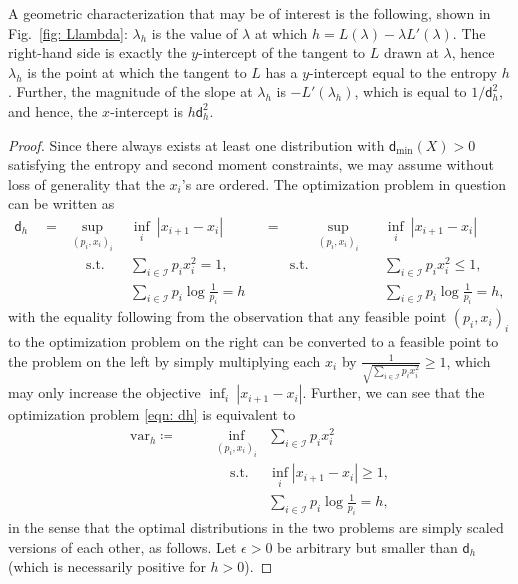 \documentclass[11pt]{article}
\newcommand{\calI}{\mathcal{I}}
\newcommand{\var}{\mathrm{var}}
\newcommand{\dmin}{\mathsf{d}_{\min}}
\newcommand{\dist}{\mathsf{d}}
\begin{document}
	A geometric characterization that may be of interest is the following, shown in Fig.~\ref{fig: Llambda}: $\lambda_h$ is the value of $\lambda$ at which $h = L(\lambda) - \lambda L'(\lambda)$.  The right-hand side is exactly the $y$-intercept of the tangent to $L$ drawn at $\lambda$, hence $\lambda_h$ is the point at which the tangent to $L$ has a $y$-intercept equal to the entropy $h$.  Further, the magnitude of the slope at $\lambda_h$ is $-L'(\lambda_h)$, which is equal to $1/\dist_h^2$, and hence, the $x$-intercept is $h \dist_h^2$.  
	
	
	\begin{proof} Since there always exists at least one distribution with $\dmin(X) > 0$ satisfying the entropy and second moment constraints, we may assume without loss of generality that the $x_i$'s are ordered.
		The optimization problem in question can be written as
		\begin{equation}
			\begin{aligned}
				\dist_h \quad =  &\sup_{(p_i, x_i)_i} &\inf_{i}\ |x_{i+1} - x_i| \qquad& =&\qquad  \sup_{(p_i, x_i)_i} \quad &\inf_{i}\ |x_{i+1} - x_i|\\
				\qquad &\quad \text{s.t.} \quad  & \sum_{i \in \calI} p_i x_i^2 = 1, \qquad & & \text{s.t.} \quad  & \sum_{i \in \calI} p_i x_i^2 \leq 1,\\
				&& \sum_{i \in \calI} p_i \log \tfrac1{p_i} = h &  && \sum_{i \in \calI} p_i \log \tfrac1{p_i} = h,
				\label{eqn: dh}
			\end{aligned}
		\end{equation}
		with the equality following from the observation that any feasible point $(p_i, x_i)_i$ to the optimization problem on the right can be converted to a feasible point to the problem on the left by simply multiplying each $x_i$ by $\frac{1}{\sqrt{\sum_{i \in \calI} p_i x_i^2}} \geq 1$, which may only increase the objective $\inf_{i}\ |x_{i+1} - x_i|$.
		Further, we can see that the optimization problem \eqref{eqn: dh} is equivalent to 
		\begin{equation}
			\begin{aligned}
				\var_h \coloneqq \qquad   &\inf_{(p_i, x_i)_i} &\sum_{i \in \calI} p_i x_i^2\\
				&\quad \text{s.t.} &\inf_{i} |x_{i+1} - x_i| \geq 1,\\
				&& \sum_{i \in \calI} p_i \log \tfrac1{p_i} = h, 
				\label{eqn: var}
			\end{aligned}
		\end{equation}
		in the sense that the optimal distributions in the two problems are simply scaled versions of each other, as follows. Let $\epsilon > 0$ be arbitrary but smaller than $\dist_h$ (which is necessarily positive for $h > 0$).

\end{proof}
\end{document}
